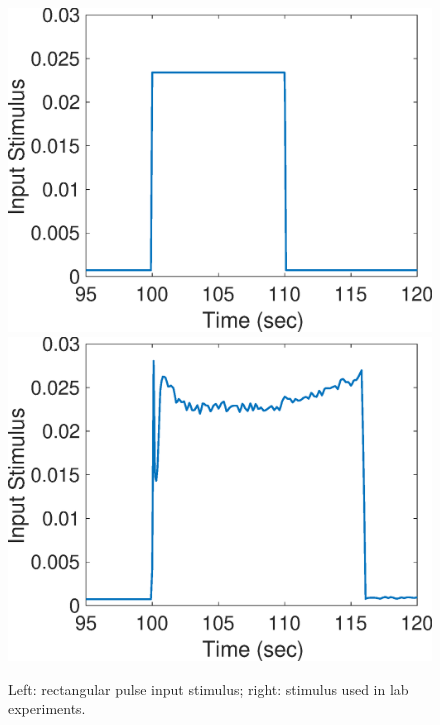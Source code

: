 \documentclass[smallextended]{svjour3}
\numberwithin{equation}{section}
\begin{document}
\begin{figure}[h]
\centering
\includegraphics[width=.4 \textwidth]{Figures/Rectangular_Stimulus.eps}
\includegraphics[width=.4 \textwidth]{Figures/Experimental_Stimulus.eps}
\caption{Left: rectangular pulse input stimulus; right: stimulus used in lab experiments.}
\label{input_stimuli}
\end{figure}
  
\end{document}
